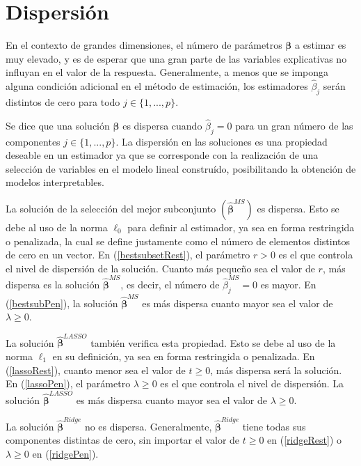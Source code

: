 \documentclass[a4paper,12pt]{report}
\begin{document}
\section{Dispersión}
En el contexto de grandes dimensiones, el número de parámetros $\boldsymbol{\beta}$ a estimar es muy elevado, y es de esperar que una gran parte de las variables explicativas no influyan en el valor de la respuesta. Generalmente, a menos que se imponga alguna condición adicional en el método de estimación, los estimadores $\hat{\beta}_j$ serán distintos de cero para todo $j \in \{1,...,p\}$.

Se dice que una solución $\boldsymbol{\hat{\beta}}$ es dispersa cuando $\hat{\beta}_j=0$ para un gran número de las componentes $j \in \{1,...,p\}$. La dispersión en las soluciones es una propiedad deseable en un estimador ya que se corresponde con la realización de una selección de variables en el modelo lineal construído, posibilitando la obtención de modelos interpretables.

La solución de la selección del mejor subconjunto $\left(\boldsymbol{\hat{\beta}}^{MS}\right)$ es dispersa. Esto se debe al uso de la norma $\ell_0$ para definir al estimador, ya sea en forma restringida o penalizada, la cual se define justamente como el número de elementos distintos de cero en un vector. En (\ref{bestsubsetRest}), el parámetro $r>0$ es el que controla el nivel de dispersión de la solución. Cuanto más pequeño sea el valor de $r$, más dispersa es la solución $\boldsymbol{\hat{\beta}}^{MS}$, es decir, el número de $\hat{\beta}^{MS}_j=0$ es mayor. En (\ref{bestsubPen}), la solución $\boldsymbol{\hat{\beta}}^{MS}$ es más dispersa cuanto mayor sea el valor de $\lambda \geq 0$.

La solución $\boldsymbol{\hat{\beta}}^{LASSO}$ también verifica esta propiedad. Esto se debe al uso de la norma $\ell_1$ en su definición, ya sea en forma restringida o penalizada. En (\ref{lassoRest}), cuanto menor sea el valor de $t \geq 0$, más dispersa será la solución. En (\ref{lassoPen}), el parámetro $\lambda \geq 0$ es el que controla el nivel de dispersión. La solución $\boldsymbol{\hat{\beta}}^{LASSO}$ es más dispersa cuanto mayor sea el valor de $\lambda \geq 0$.

La solución $\boldsymbol{\hat{\beta}}^{Ridge}$ no es dispersa. Generalmente, $\boldsymbol{\hat{\beta}}^{Ridge}$ tiene todas sus componentes distintas de cero, sin importar el valor de $t \geq 0$ en (\ref{ridgeRest}) o $\lambda \geq 0$ en (\ref{ridgePen}).
\end{document}
